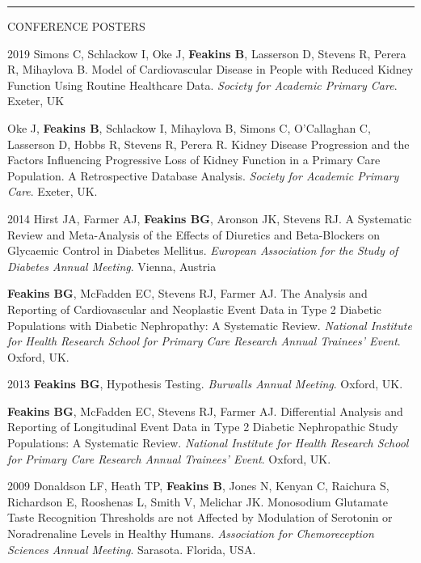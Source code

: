 \documentclass[10pt,a4paper]{article}
\begin{document}
\noindent\rule{\textwidth}{0.4pt}
\begin{cvlist}{CONFERENCE POSTERS}
  
  \item[2019]
  Simons C, Schlackow I, Oke J, \textbf{Feakins B}, Lasserson D, Stevens R, Perera R, Mihaylova B. Model of Cardiovascular Disease in People with Reduced Kidney Function Using Routine Healthcare Data. \textit{Society for Academic Primary Care}. Exeter, UK
  
  \item[]
  Oke J, \textbf{Feakins B}, Schlackow I, Mihaylova B, Simons C, O’Callaghan C, Lasserson D, Hobbs R, Stevens R, Perera R. Kidney Disease Progression and the Factors Influencing Progressive Loss of Kidney Function in a Primary Care Population. A Retrospective Database Analysis. \textit{Society for Academic Primary Care}. Exeter, UK.
  
  \item[2014]
  Hirst JA, Farmer AJ, \textbf{Feakins BG}, Aronson JK, Stevens RJ. A Systematic Review and Meta-Analysis of the Effects of Diuretics and Beta-Blockers on Glycaemic Control in Diabetes Mellitus. \textit{European Association for the Study of Diabetes Annual Meeting}. Vienna, Austria
  
  \item[]
  \textbf{Feakins BG}, McFadden EC, Stevens RJ, Farmer AJ. The Analysis and Reporting of Cardiovascular and Neoplastic Event Data in Type 2 Diabetic Populations with Diabetic Nephropathy: A Systematic Review. \textit{National Institute for Health Research School for Primary Care Research Annual Trainees' Event}. Oxford, UK.
  
  \item[2013]
  \textbf{Feakins BG}, Hypothesis Testing. \textit{Burwalls Annual Meeting}. Oxford, UK.
  
  \item[]
  \textbf{Feakins BG}, McFadden EC, Stevens RJ, Farmer AJ. Differential Analysis and Reporting of Longitudinal Event Data in Type 2 Diabetic Nephropathic Study Populations: A Systematic Review. \textit{National Institute for Health Research School for Primary Care Research Annual Trainees' Event}. Oxford, UK.
  
  \item[2009]
  Donaldson LF, Heath TP, \textbf{Feakins B}, Jones N, Kenyan C, Raichura S, Richardson E, Rooshenas L, Smith V, Melichar JK. Monosodium Glutamate Taste Recognition Thresholds are not Affected by Modulation of Serotonin or Noradrenaline Levels in Healthy Humans. \textit{Association for Chemoreception Sciences Annual Meeting}. Sarasota. Florida, USA.
  
\end{cvlist}
\end{document}
